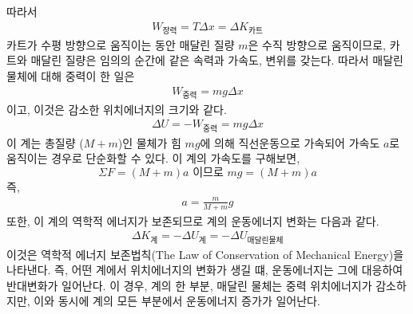 \documentclass[12pt,a4paper]{article}
\begin{document}
따라서
\begin{equation}
    \begin{aligned}
        W_{\textrm{장력}} = T\Delta x = \Delta K_{\textrm{카트}}
        \label{eq13}
    \end{aligned}
\end{equation}
카트가 수평 방향으로 움직이는 동안 매달린 질량 $m$은 수직 방향으로 움직이므로, 카트와
매달린 질량은 임의의 순간에 같은 속력과 가속도, 변위를 갖는다. 따라서 매달린 물체에
대해 중력이 한 일은
\begin{equation}
    \begin{aligned}
        W_{\textrm{중력}} = mg\Delta x
        \label{eq14}
    \end{aligned}
\end{equation}
이고, 이것은 감소한 위치에너지의 크기와 같다.
\begin{equation}
    \begin{aligned}
        \Delta U = -W_{\textrm{중력}} = mg\Delta x
        \label{eq15}
    \end{aligned}
\end{equation}
이 계는 총질량 ($M+m$)인 물체가 힘 $mg$에 의해 직선운동으로 가속되어 가속도 $a$로
움직이는 경우로 단순화할 수 있다. 이 계의 가속도를 구해보면,
$$\Sigma F = (M + m)a \textrm{ 이므로 } mg = (M + m)a$$
즉,
\begin{equation}
    \begin{aligned}
        a = \frac{m}{M+m}g
        \label{eq16}
    \end{aligned}
\end{equation}
또한, 이 계의 역학적 에너지가 보존되므로 계의 운동에너지 변화는 다음과 같다.
\begin{equation}
    \begin{aligned}
        \Delta K_{\textrm{계}} = -\Delta U_{\textrm{계}} = -\Delta
            U_{\textrm{매달린물체}}
        \label{eq17}
    \end{aligned}
\end{equation}
이것은 역학적 에너지 보존법칙(The Law of Conservation of Mechanical Energy)을
나타낸다. 즉, 어떤 계에서 위치에너지의 변화가 생길 떄, 운동에너지는 그에 대응하여
반대변화가 일어난다. 이 경우, 계의 한 부분, 매달린 물체는 중력 위치에너지가
감소하지만, 이와 동시에 계의 모든 부분에서 운동에너지 증가가 일어난다.
\end{document}
